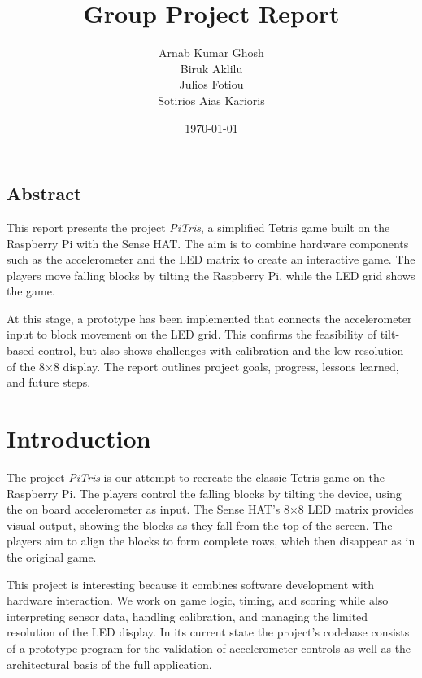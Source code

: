 \documentclass[11pt,titlepage,openright]{book}
\begin{document}
\frontmatter
\title{Group Project Report}
\author{Arnab Kumar Ghosh \\ 
        Biruk Aklilu \\ 
        Julios Fotiou \\ 
        Sotirios Aias Karioris}
\date{\today}

\maketitle

\vspace*{3cm}
\section*{Abstract}
This report presents the project \textit{PiTris}, a simplified Tetris game built on the Raspberry Pi with the Sense HAT. The aim is to combine hardware components such as the accelerometer and the LED matrix to create an interactive game. The players move falling blocks by tilting the Raspberry Pi, while the LED grid shows the game.

At this stage, a prototype has been implemented that connects the accelerometer input to block movement on the LED grid. This confirms the feasibility of tilt-based control, but also shows challenges with calibration and the low resolution of the 8×8 display. The report outlines project goals, progress, lessons learned, and future steps.


\tableofcontents

\mainmatter

\chapter{Introduction}
The project \textit{PiTris} is our attempt to recreate the classic Tetris game on the Raspberry Pi. The players control the falling blocks by tilting the device, using the on board accelerometer as input. The Sense HAT’s 8×8 LED matrix provides visual output, showing the blocks as they fall from the top of the screen. The players aim to align the blocks to form complete rows, which then disappear as in the original game.  

This project is interesting because it combines software development with hardware interaction. We work on game logic, timing, and scoring while also interpreting sensor data, handling calibration, and managing the limited resolution of the LED display. In its current state the project's codebase consists of a prototype program for the validation of accelerometer controls as well as the architectural basis of the full application.
\end{document}
